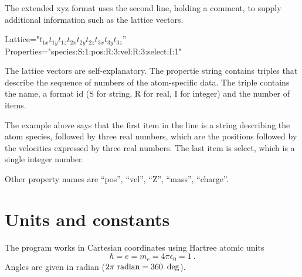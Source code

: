 \documentclass[final,12pt,makeidx,DIV=calc]{article}
\begin{document}
{{{The extended xyz format uses the second line, holding a comment, to
supply additional information such as the lattice vectors.

\begin{centerline}
Lattice="$t_{1x} t_{1y} t_{1z} t_{2x} t_{2y} t_{2z}  t_{3x} t_{3y} t_{3z}$''
Properties="species:S:1:pos:R:3:vel:R:3:select:I:1"
\end{centerline}
The lattice vectors are self-explanatory. The propertie string
contains triples that describe the sequence of numbers of the
atom-specific data. The triple contains the name, a format id (S for
string, R for real, I for integer) and the number of items.

The example above says that the first item in the line is a string
describing the atom species, followed by three real numbers, which are
the positions followed by the velocities expressed by three real
numbers. The last item is select, which is a single integer number.

Other property names are ``pos'', ``vel'', ``Z'', ``mass'', ``charge''.


\newpage
\section{Units and constants}
\label{constants}

The program works in Cartesian coordinates using Hartree atomic units
\begin{equation}
\hbar=e=m_e=4\pi\epsilon_0=1 \ .
\end{equation}
Angles are given in radian ($2\pi~{\rm radian}=360~\deg$).

}}}
\end{document}
